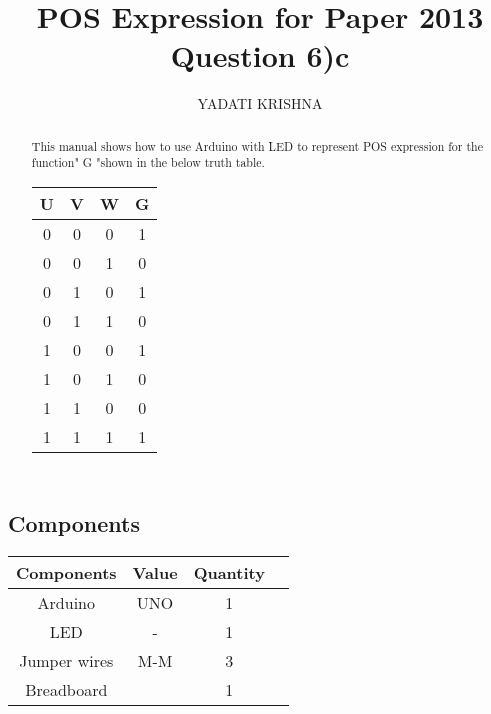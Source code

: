 \documentclass{article}
\title{POS Expression for Paper 2013 Question 6)c}
\author{YADATI KRISHNA}
\begin{document}
\maketitle
\begin{multicols}{2}
\tableofcontents
\vspace{10mm}

\begin{abstract}
 This manual shows how to use Arduino with LED to represent POS expression for the function" G "shown in the  below truth table. \\
 
 \vspace{3mm}
 \centering
 
 \begin{tabular}{ |c |c |c |c |}
 \hline
 U  &  V  &  W  &  G\\
 \hline
 0  &  0  &  0  &  1\\
 \hline
 0  &  0  &  1  &  0\\
 \hline
 0  &  1  &  0  &  1\\
 \hline
 0  &  1  &  1  &  0\\
 \hline
 1  &  0  &  0  &  1\\
 \hline
 1  &  0  &  1  &  0\\
 \hline
 1  &  1  &  0  &  0\\
 \hline
 1  &  1  &  1  &  1\\
 \hline
 \end{tabular}
 \end{abstract}
 
\section{Components}

    \centering
    \begin{tabular}{ |c |c |c |c |}
\hline
\textbf{Components} & \textbf{Value} & \textbf{Quantity} \\
\hline
 Arduino & UNO & 1 \\  
 LED & - & 1 \\
 Jumper wires&M-M &3\\
 Breadboard& &1\\
 \hline
 \end{tabular}
 \vspace{3mm}
 

\end{multicols}
\end{document}

